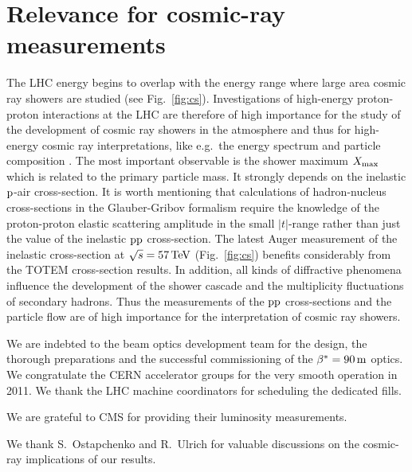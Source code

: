 \documentclass[doublecol]{epl/epl2}
\def\un#1{\,{\rm #1}}
\begin{document}
\FigRatio

\section{Relevance for cosmic-ray measurements}

The LHC energy begins to overlap with the energy range where large area cosmic ray showers are studied (see Fig.~\ref{fig:cs}). Investigations of high-energy proton-proton interactions at the LHC are therefore of high importance for the study of the development of cosmic ray showers in the atmosphere and thus for high-energy cosmic ray interpretations, like e.g.~the energy spectrum and particle composition \cite{enterria}.  The most important observable is the shower maximum $X_{\rm max}$ which is related to the primary particle mass. It strongly depends on the inelastic $\rm p$-air cross-section. It is worth mentioning that calculations of hadron-nucleus cross-sections in the Glauber-Gribov formalism \cite{nagano,glauber} require the knowledge of the proton-proton elastic scattering amplitude in the small $|t|$-range rather than just the value of the inelastic $\rm pp$ cross-section. The latest Auger measurement of the inelastic cross-section at $\sqrt s = 57\un{TeV}$ (Fig.~\ref{fig:cs}) benefits considerably from the TOTEM cross-section results. In addition, all kinds of diffractive phenomena influence the development of the shower cascade and the multiplicity fluctuations of secondary hadrons. Thus the measurements of the $\rm pp$ cross-sections and the particle flow are of high importance for the interpretation of cosmic ray showers.

\vskip-5mm
\acknowledgments
\vskip-4mm

We are indebted to the beam optics development team
for the design, the thorough preparations and the successful commissioning of the $\beta^* = 90\un{m}$ optics. We congratulate the CERN accelerator groups for the very smooth operation in 2011. We thank
the LHC machine coordinators for scheduling the dedicated fills.

We are grateful to CMS for providing their luminosity measurements.

We thank S.~Ostapchenko and R.~Ulrich for valuable discussions on the cosmic-ray implications of our results.
\end{document}

